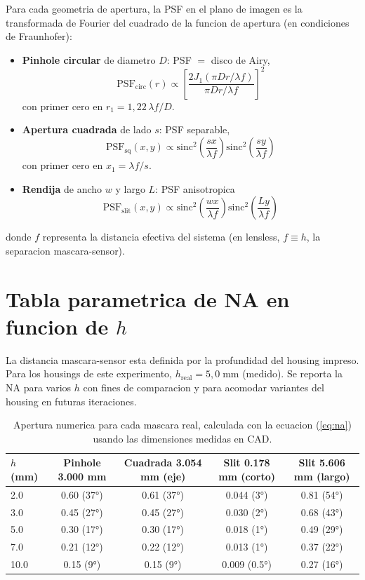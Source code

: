 \documentclass[11pt,a4paper,oneside]{report}
\begin{document}
Para cada geometria de apertura, la PSF en el plano de imagen es la
transformada de Fourier del cuadrado de la funcion de apertura
(en condiciones de Fraunhofer):

\begin{itemize}[leftmargin=2.2em]
  \item \textbf{Pinhole circular} de diametro $D$: PSF $=$ disco de Airy,
  \[
  \mathrm{PSF}_{\text{circ}}(r) \propto \left[\frac{2 J_1(\pi D r / \lambda f)}{\pi D r / \lambda f}\right]^2
  \]
  con primer cero en $r_1 = 1{,}22\,\lambda f / D$.
  \item \textbf{Apertura cuadrada} de lado $s$: PSF separable,
  \[
  \mathrm{PSF}_{\text{sq}}(x,y) \propto \mathrm{sinc}^2\!\left(\frac{s x}{\lambda f}\right) \mathrm{sinc}^2\!\left(\frac{s y}{\lambda f}\right)
  \]
  con primer cero en $x_1 = \lambda f / s$.
  \item \textbf{Rendija} de ancho $w$ y largo $L$: PSF anisotropica
  \[
  \mathrm{PSF}_{\text{slit}}(x,y) \propto \mathrm{sinc}^2\!\left(\frac{w x}{\lambda f}\right) \mathrm{sinc}^2\!\left(\frac{L y}{\lambda f}\right)
  \]
\end{itemize}

donde $f$ representa la distancia efectiva del sistema (en lensless,
$f \equiv h$, la separacion mascara-sensor).

\section{Tabla parametrica de NA en funcion de $h$}

La distancia mascara-sensor esta definida por la profundidad del housing
impreso. Para los housings de este experimento, $h_{\text{real}} = 5{,}0\;\mathrm{mm}$
(medido). Se reporta la NA para varios $h$ con fines de comparacion y para
acomodar variantes del housing en futuras iteraciones.

\begin{table}[h!]
\centering
\caption{Apertura numerica para cada mascara real, calculada con la
ecuacion (\ref{eq:na}) usando las dimensiones medidas en CAD.}
\renewcommand{\arraystretch}{1.3}
\begin{tabular}{lcccc}
\toprule
\textbf{$h$ (mm)} & \textbf{Pinhole 3.000 mm} & \textbf{Cuadrada 3.054 mm (eje)} & \textbf{Slit 0.178 mm (corto)} & \textbf{Slit 5.606 mm (largo)} \\
\midrule
2.0 & 0.60 (37°) & 0.61 (37°) & 0.044 (3°)  & 0.81 (54°) \\
3.0 & 0.45 (27°) & 0.45 (27°) & 0.030 (2°)  & 0.68 (43°) \\
5.0 & 0.30 (17°) & 0.30 (17°) & 0.018 (1°)  & 0.49 (29°) \\
7.0 & 0.21 (12°) & 0.22 (12°) & 0.013 (1°)  & 0.37 (22°) \\
10.0 & 0.15 (9°) & 0.15 (9°)  & 0.009 (0.5°) & 0.27 (16°) \\
\bottomrule
\end{tabular}
\label{tab:na-real}
\end{table}
\end{document}

